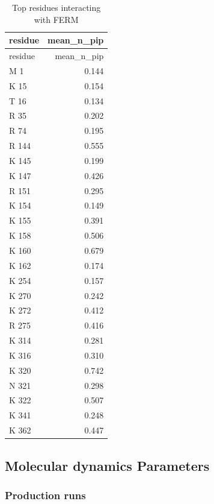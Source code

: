 \documentclass[
  twocolumn]{biophys-new-mod}
\begin{document}
\hypertarget{tbl-ferm-top-interacting}{}
\begin{longtable}[]{@{}lr@{}}
\caption{\label{tbl-ferm-top-interacting}Top residues interacting with
FERM}\tabularnewline
\toprule()
residue & mean\_n\_pip \\
\midrule()
\endfirsthead
\toprule()
residue & mean\_n\_pip \\
\midrule()
\endhead
M 1 & 0.144 \\
K 15 & 0.154 \\
T 16 & 0.134 \\
R 35 & 0.202 \\
R 74 & 0.195 \\
R 144 & 0.555 \\
K 145 & 0.199 \\
K 147 & 0.426 \\
R 151 & 0.295 \\
K 154 & 0.149 \\
K 155 & 0.391 \\
K 158 & 0.506 \\
K 160 & 0.679 \\
K 162 & 0.174 \\
K 254 & 0.157 \\
K 270 & 0.242 \\
K 272 & 0.412 \\
R 275 & 0.416 \\
K 314 & 0.281 \\
K 316 & 0.310 \\
K 320 & 0.742 \\
N 321 & 0.298 \\
K 322 & 0.507 \\
K 341 & 0.248 \\
K 362 & 0.447 \\
\bottomrule()
\end{longtable}

\hypertarget{molecular-dynamics-parameters}{%
\subsection{Molecular dynamics
Parameters}\label{molecular-dynamics-parameters}}

\hypertarget{sec-prod-mdp}{%
\subsubsection{Production runs}\label{sec-prod-mdp}}
\end{document}
